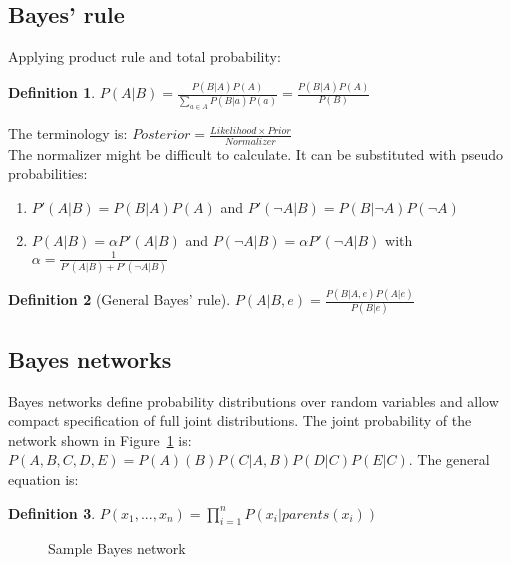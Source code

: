 \documentclass{report}
\newtheorem{definition}{Definition}[section]
\begin{document}
\subsection{Bayes' rule}
Applying product rule and total probability:
\begin{definition}
$P(A\vert B) = \frac{P(B\vert A)P(A)}{\sum_{a\in A}{P(B\vert a)P(a)}} = \frac{P(B\vert A)P(A)}{P(B)}$
\end{definition}

The terminology is: $Posterior = \frac{Likelihood\times Prior}{Normalizer}$\\

The normalizer might be difficult to calculate. It can be substituted with pseudo probabilities:
\begin{enumerate}
\item $P'(A\vert B) = P(B\vert A)P(A)$ and $P'(\neg A\vert B) = P(B\vert \neg A)P(\neg A)$
\item $P(A\vert B) = \alpha P'(A\vert B)$ and $P(\neg A\vert B) = \alpha P'(\neg A\vert B)$ with $\alpha = \frac{1}{P'(A\vert B) + P'(\neg A\vert B)}$
\end{enumerate}

\begin{definition}[General Bayes' rule]
$P(A\vert B,e) = \frac{P(B\vert A,e)P(A\vert e)}{P(B\vert e)}$
\end{definition}


\subsection{Bayes networks}
Bayes networks define probability distributions over random variables and allow compact specification of full joint distributions. The joint probability of the network shown in Figure~\ref{ref:samplenetwork} is: $P(A,B,C,D,E)=P(A)(B)P(C\vert A,B)P(D\vert C)P(E\vert C)$. The general equation is:
\begin{definition}
$P(x_1,...,x_n) = \prod_{i=1}^{n}{P(x_i\vert parents(x_i))}$
\end{definition}


\begin{figure}[h!]
\centering
{}
\caption{Sample Bayes network}
\label{ref:samplenetwork}
\end{figure}
\end{document}
